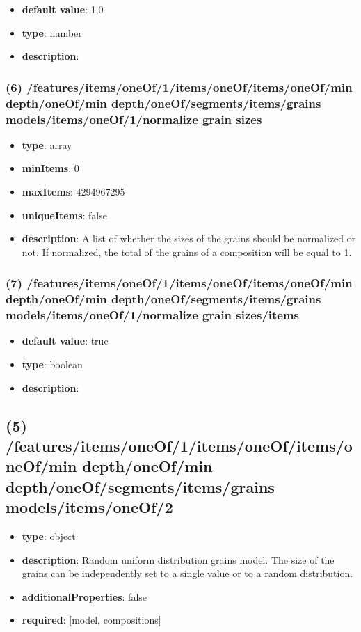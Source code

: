 \begin{itemize}[leftmargin=7em]\item {\bf default value}: 1.0
\item {\bf type}: number
\item {\bf description}: 
\end{itemize}\subsubsection{(6) /features/items/oneOf/1/items/oneOf/items/oneOf/min depth/oneOf/min depth/oneOf/segments/items/grains models/items/oneOf/1/normalize grain sizes}
\begin{itemize}[leftmargin=6em]\item {\bf type}: array
\item {\bf minItems}: 0
\item {\bf maxItems}: 4294967295
\item {\bf uniqueItems}: false
\item {\bf description}: A list of whether the sizes of the grains should be normalized or not. If normalized, the total of the grains of a composition will be equal to 1.
\end{itemize}\subsubsection{(7) /features/items/oneOf/1/items/oneOf/items/oneOf/min depth/oneOf/min depth/oneOf/segments/items/grains models/items/oneOf/1/normalize grain sizes/items}
\begin{itemize}[leftmargin=7em]\item {\bf default value}: true
\item {\bf type}: boolean
\item {\bf description}: 
\end{itemize}\subsection{(5) /features/items/oneOf/1/items/oneOf/items/oneOf/min depth/oneOf/min depth/oneOf/segments/items/grains models/items/oneOf/2}
\begin{itemize}[leftmargin=5em]\item {\bf type}: object
\item {\bf description}: Random uniform distribution grains model. The size of the grains can be independently set to a single value or to a random distribution.
\item {\bf additionalProperties}: false
\item {\bf required}: [model, compositions]\end{itemize}
